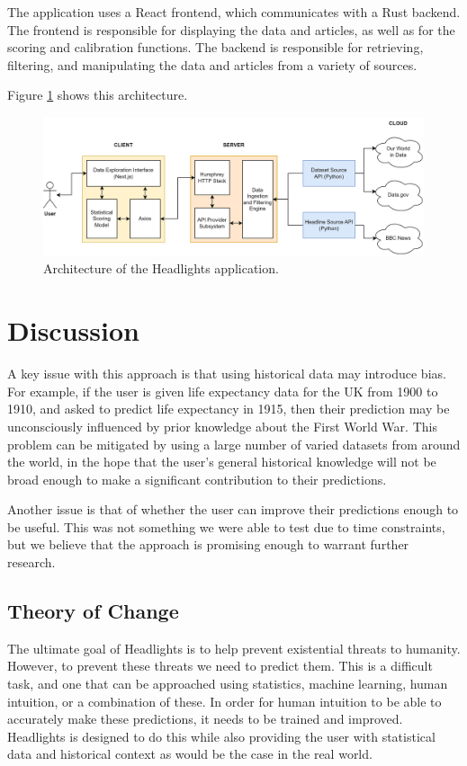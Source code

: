 \documentclass{article}
\begin{document}
The application uses a React frontend, which communicates with a Rust backend. The frontend is responsible for displaying the data and articles, as well as for the scoring and calibration functions. The backend is responsible for retrieving, filtering, and manipulating the data and articles from a variety of sources.

Figure \ref{fig:architecture} shows this architecture.

\begin{figure}[h]
  \centering
  \includegraphics[width=\textwidth]{architecture.png}
  \caption{Architecture of the Headlights application.}
  \label{fig:architecture}
\end{figure}

\section{Discussion}

A key issue with this approach is that using historical data may introduce bias. For example, if the user is given life expectancy data for the UK from 1900 to 1910, and asked to predict life expectancy in 1915, then their prediction may be unconsciously influenced by prior knowledge about the First World War. This problem can be mitigated by using a large number of varied datasets from around the world, in the hope that the user's general historical knowledge will not be broad enough to make a significant contribution to their predictions.

Another issue is that of whether the user can improve their predictions enough to be useful. This was not something we were able to test due to time constraints, but we believe that the approach is promising enough to warrant further research.

\subsection{Theory of Change}

The ultimate goal of Headlights is to help prevent existential threats to humanity. However, to prevent these threats we need to predict them. This is a difficult task, and one that can be approached using statistics, machine learning, human intuition, or a combination of these. In order for human intuition to be able to accurately make these predictions, it needs to be trained and improved. Headlights is designed to do this while also providing the user with statistical data and historical context as would be the case in the real world.
\end{document}
